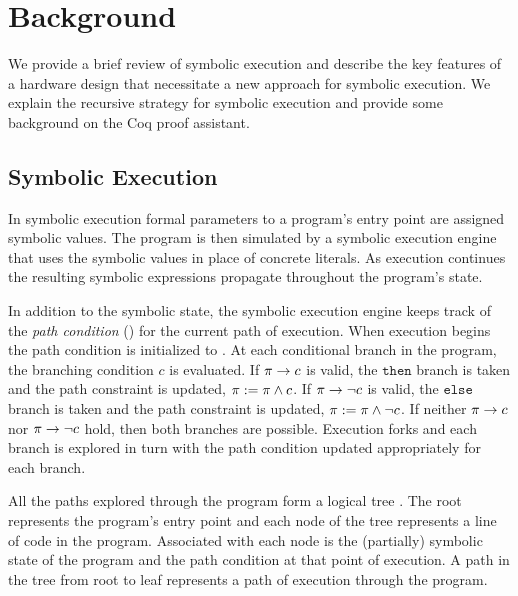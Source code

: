 \section{Background}
We provide a brief review of symbolic execution and describe the key features
of a hardware design that necessitate a new approach for symbolic execution. We
explain the recursive strategy for symbolic execution and provide some
background on the Coq proof assistant.

\subsection{Symbolic Execution}
In symbolic execution formal parameters to a program's entry point are
assigned symbolic values. The program is then simulated by a symbolic execution
engine that uses the symbolic values in place of concrete literals. As
execution continues the resulting symbolic expressions propagate throughout the program's
state.

In addition to the symbolic state, the symbolic execution engine keeps track
of the \emph{path condition} (\pathcondition) for the current path of
execution. When execution begins the path condition is initialized 
to \texttrue. At each conditional branch in the program, the branching condition $c$ is evaluated. If $\pi
\rightarrow c$ is valid, the $\mathtt{then}$ branch is taken and the path constraint is
updated, $\pi := \pi \wedge c$. If $\pi \rightarrow \neg c$ is valid, the $\mathtt{else}$
branch is taken and the path constraint is updated, $\pi := \pi \wedge \neg
c$. If neither $\pi \rightarrow c$ nor $\pi \rightarrow \neg c$ hold, then both
branches are possible. Execution forks and each branch is explored in turn
with the path condition updated appropriately for each branch.

All the paths explored through the program form a logical tree \tree. The root represents the
program's entry point and each node of the
tree represents a line of code in the program. Associated with each node is the
(partially) symbolic state of the program and the path condition at that point
of execution. A path in the tree from root to leaf
represents a path of execution through the program.

